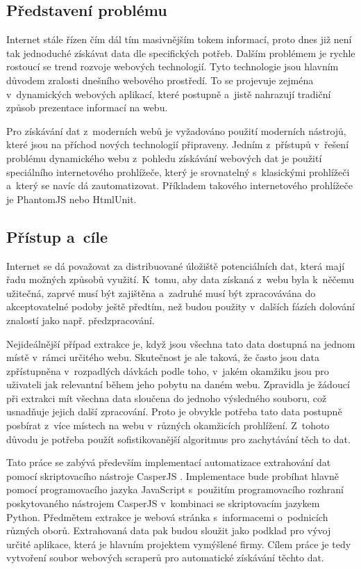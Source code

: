 \documentclass[11pt,a4paper]{article}
\begin{document}
\subsection{Představení problému}
Internet stále řízen čím dál tím masivnějším tokem informací, proto dnes již není tak jednoduché získávat data dle specifických potřeb. Dalším problémem je rychle rostoucí se trend rozvoje webových technologií. Tyto technologie jsou hlavním důvodem zralosti dnešního webového prostředí. To se projevuje zejména v~dynamických webových aplikací, které postupně a~jistě nahrazují tradiční způsob prezentace informací na webu. 

Pro získávání dat z~moderních webů je vyžadováno použití moderních nástrojů, které jsou na příchod nových technologií připraveny. Jedním z~přístupů v~řešení problému dynamického webu z~pohledu získávání webových dat je použití speciálního internetového prohlížeče, který je srovnatelný s~klasickými prohlížeči a~který se navíc dá zautomatizovat. Příkladem takového internetového prohlížeče je PhantomJS \cite{phantomjs} nebo HtmlUnit.

\subsection{Přístup a~cíle}
Internet se dá považovat za distribuované úložiště potenciálních dat, která mají řadu možných způsobů využití. K~tomu, aby data získaná z~webu byla k~něčemu užitečná, zaprvé musí být zajištěna a~zadruhé musí být zpracovávána do akceptovatelné podoby ještě předtím, než budou použity v~dalších fázích dolování znalostí jako např. předzpracování. 

Nejideálnější případ extrakce je, když jsou všechna tato data dostupná na jednom místě v~rámci určitého webu. Skutečnost je ale taková, že často jsou data zpřístupněna v~rozpadlých dávkách podle toho, v~jakém okamžiku jsou pro uživateli jak relevantní během jeho pobytu na daném webu. Zpravidla je žádoucí při extrakci mít všechna data sloučena do jednoho výsledného souboru, což usnadňuje jejich další zpracování. Proto je obvykle potřeba tato data postupně posbírat z~více místech na webu v~různých okamžicích prohlížení. Z~tohoto důvodu je potřeba použít sofistikovanější algoritmus pro zachytávání těch to dat.

Tato práce se zabývá především implementací automatizace extrahování dat pomocí skriptovacího nástroje CasperJS \cite{casperjs}. Implementace bude probíhat hlavně pomocí programovacího jazyka JavaScript s~použitím programovacího rozhraní poskytovaného nástrojem CasperJS v~kombinaci se skriptovacím jazykem Python. Předmětem extrakce je webová stránka s~informacemi o~podnicích různých oborů. Extrahovaná data pak budou sloužit jako podklad pro vývoj určité aplikace, která je hlavním projektem vymýšlené firmy. Cílem práce je tedy vytvoření soubor webových scraperů pro automatické získávání těchto dat.
\end{document}
